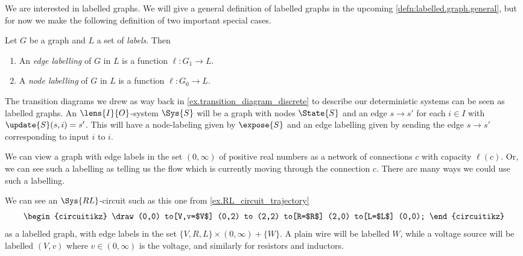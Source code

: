 \documentclass[DynamicalBook]{subfiles}
\begin{document}
We are interested in labelled graphs. We will give a general definition of labelled graphs in the upcoming \cref{defn:labelled.graph.general}, but for now we make the following definition of two important special cases.
\begin{definition}\label{defn:labelled.graph}
  Let $G$ be a graph and $L$ a set of \emph{labels}. Then
  \begin{enumerate}
          \item An \emph{edge labelling} of $G$ in $L$ is a function $\ell : G_{1} \to L$.
         \item A \emph{node labelling} of $G$ in $L$ is a function $\ell : G_{0} \to L$.
  \end{enumerate}
\end{definition}

\begin{example}\label{ex:transition.system.labelled.graph}
The transition diagrams we drew as way back in \cref{ex.transition_diagram_discrete} to describe our deterministic systems can be seen as labelled graphs. An $\lens{I}{O}$-system $\Sys{S}$ will be a graph with nodes $\State{S}$ and an edge $s \to s'$ for each $i \in I$ with $\update{S}(s, i) = s'$. This will have a node-labeling given by $\expose{S}$ and an edge labelling given by sending the edge $s \to s'$ corresponding to input $i$ to $i$.
  \end{example}

\begin{example}
We can view a graph with edge labels in the set $(0, \infty)$ of positive real numbers as a network of connections $c$ with capacity $\ell(c)$. Or, we can see such a labelling as telling us the flow which is currently moving through the connection $c$. There are many ways we could use such a labelling.
  \end{example}

  \begin{example}
We can see an $\Sys{RL}$-circuit such as this one from \cref{ex.RL_circuit_trajectory}
  \[
    \begin{circuitikz}
      \draw (0,0)
      to[V,v=$V$] (0,2) %
      to (2,2)
      to[R=$R$] (2,0) %
      to[L=$L$] (0,0);
    \end{circuitikz}
  \]
  as a labelled graph, with edge labels in the set $\{V, R, L\} \times (0, \infty) + \{W\}$. A plain wire will be labelled $W$, while a voltage source will be labelled $(V, v)$ where $v \in (0, \infty)$ is the voltage, and similarly for resistors and inductors.
  \end{example}
\end{document}
